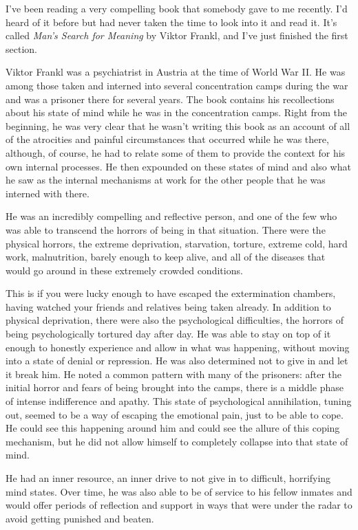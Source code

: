 I've been reading a very compelling book that somebody gave to me recently. I'd heard of it before but had never taken the time to look into it and read it. It's called \emph{Man's Search for Meaning} by Viktor Frankl, and I've just finished the first section.

Viktor Frankl was a psychiatrist in Austria at the time of World War II. He was among those taken and interned into several concentration camps during the war and was a prisoner there for several years. The book contains his recollections about his state of mind while he was in the concentration camps. Right from the beginning, he was very clear that he wasn't writing this book as an account of all of the atrocities and painful circumstances that occurred while he was there, although, of course, he had to relate some of them to provide the context for his own internal processes. He then expounded on these states of mind and also what he saw as the internal mechanisms at work for the other people that he was interned with there.

He was an incredibly compelling and reflective person, and one of the few who was able to transcend the horrors of being in that situation. There were the physical horrors, the extreme deprivation, starvation, torture, extreme cold, hard work, malnutrition, barely enough to keep alive, and all of the diseases that would go around in these extremely crowded conditions.

This is if you were lucky enough to have escaped the extermination chambers, having watched your friends and relatives being taken already. In addition to physical deprivation, there were also the psychological difficulties, the horrors of being psychologically tortured day after day. He was able to stay on top of it enough to honestly experience and allow in what was happening, without moving into a state of denial or repression. He was also determined not to give in and let it break him. He noted a common pattern with many of the prisoners: after the initial horror and fears of being brought into the camps, there is a middle phase of intense indifference and apathy. This state of psychological annihilation, tuning out, seemed to be a way of escaping the emotional pain, just to be able to cope. He could see this happening around him and could see the allure of this coping mechanism, but he did not allow himself to completely collapse into that state of mind.

He had an inner resource, an inner drive to not give in to difficult, horrifying mind states. Over time, he was also able to be of service to his fellow inmates and would offer periods of reflection and support in ways that were under the radar to avoid getting punished and beaten.

